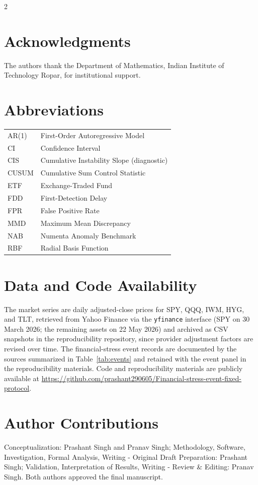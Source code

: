\documentclass{book}
\begin{document}
\begin{multicols}{2}
\section*{Acknowledgments}
The authors thank the Department of Mathematics, Indian Institute of Technology Ropar, for institutional support.

\section*{Abbreviations}
\begin{tabular}{@{}ll@{}}
AR(1) & First-Order Autoregressive Model\\
CI & Confidence Interval\\
CIS & Cumulative Instability Slope (diagnostic)\\
CUSUM & Cumulative Sum Control Statistic\\
ETF & Exchange-Traded Fund\\
FDD & First-Detection Delay\\
FPR & False Positive Rate\\
MMD & Maximum Mean Discrepancy\\
NAB & Numenta Anomaly Benchmark\\
RBF & Radial Basis Function\\
\end{tabular}

\section*{Data and Code Availability}
The market series are daily adjusted-close prices for SPY, QQQ, IWM, HYG, and TLT, retrieved from Yahoo Finance via the \texttt{yfinance} interface (SPY on 30 March 2026; the remaining assets on 22 May 2026) and archived as CSV snapshots in the reproducibility repository, since provider adjustment factors are revised over time. The financial-stress event records are documented by the sources summarized in Table~\ref{tab:events} and retained with the event panel in the reproducibility materials. Code and reproducibility materials are publicly available at \url{https://github.com/prashant290605/Financial-stress-event-fixed-protocol}.

\section*{Author Contributions}
Conceptualization: Prashant Singh and Pranav Singh; Methodology, Software, Investigation, Formal Analysis, Writing - Original Draft Preparation: Prashant Singh; Validation, Interpretation of Results, Writing - Review \& Editing: Pranav Singh. Both authors approved the final manuscript.


\end{multicols}
\end{document}
